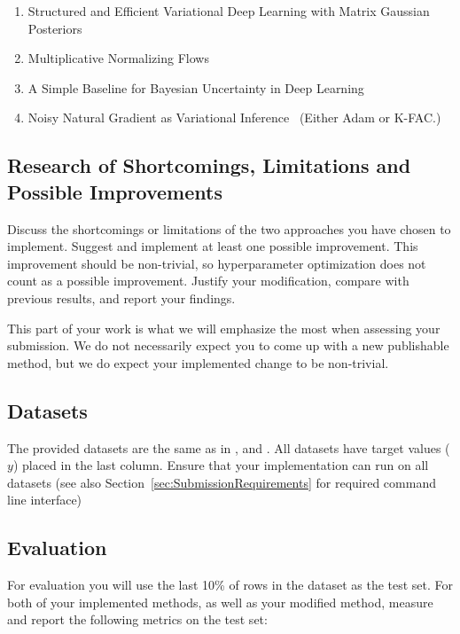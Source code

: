 \documentclass[a4paper, 12pt]{article}
\begin{document}
\begin{enumerate}
    \item Structured and Efficient Variational Deep Learning with Matrix Gaussian
          Posteriors~\citep{pmlr-v48-louizos16}
    \item Multiplicative Normalizing Flows~\citep{pmlr-v70-louizos17a}
    \item A Simple Baseline for Bayesian Uncertainty in Deep Learning~\citep{NEURIPS2019_118921ef}
    \item Noisy Natural Gradient as Variational Inference~\citep{pmlr-v80-zhang18l} (Either Adam or
          K-FAC.)
\end{enumerate}

\subsection{Research of Shortcomings, Limitations and Possible Improvements}\label{sec:Research}
Discuss the shortcomings or limitations of the two approaches you have chosen to implement. Suggest
and implement at least one possible improvement. This improvement should be non-trivial, so
hyperparameter optimization does not count as a possible improvement. Justify your modification,
compare with previous results, and report your findings.

This part of your work is what we will emphasize the most when assessing your submission. We do not
necessarily expect you to come up with a new publishable method, but we do expect your implemented
change to be non-trivial.

\subsection{Datasets}\label{sec:Datasets}
The provided datasets are the same as in \citet{pmlr-v80-zhang18l}, and \citet{pmlr-v48-louizos16}.
All datasets have target values (\(y\)) placed in the last column. Ensure that your implementation
can run on all datasets (see also Section~\ref{sec:SubmissionRequirements} for required command line
interface)

\subsection{Evaluation}\label{sec:Evaluation}
For evaluation you will use the last 10\% of rows in the dataset as the test set. For both of your
implemented methods, as well as your modified method, measure and report the following metrics on
the test set:
\end{document}
